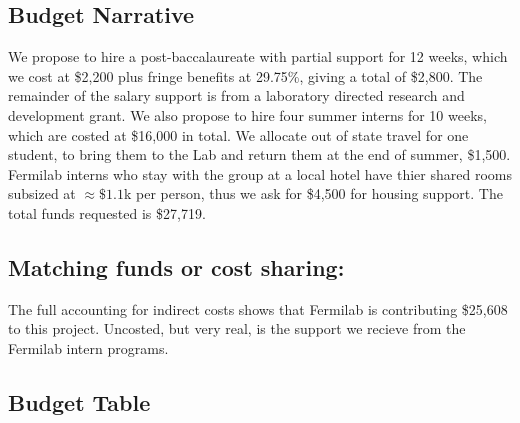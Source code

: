 
\subsection{Budget Narrative}


%

We propose to hire a post-baccalaureate with partial support for 12 weeks, which we cost at \$2,200 
plus fringe benefits at 29.75\%, giving a total of \$2,800.  The remainder of the salary
support is from a laboratory directed research and development grant. 
We also propose to hire four summer interns for 10 weeks, which are costed at \$16,000 in total.  
We allocate out of state travel for one student, to bring them to the Lab and return them at the
end of summer, \$1,500. Fermilab interns who stay with the group at a local hotel have thier
shared rooms subsized at $\approx \$1.1$k per person, thus we ask for \$4,500 for housing support.
The total funds requested is \$27,719.



\subsection{Matching funds or cost sharing:}
The full accounting for indirect costs shows that Fermilab is contributing \$25,608 to this
project. Uncosted, but very real, is the support we recieve from the Fermilab intern programs.

\newpage
\subsection{Budget Table}


